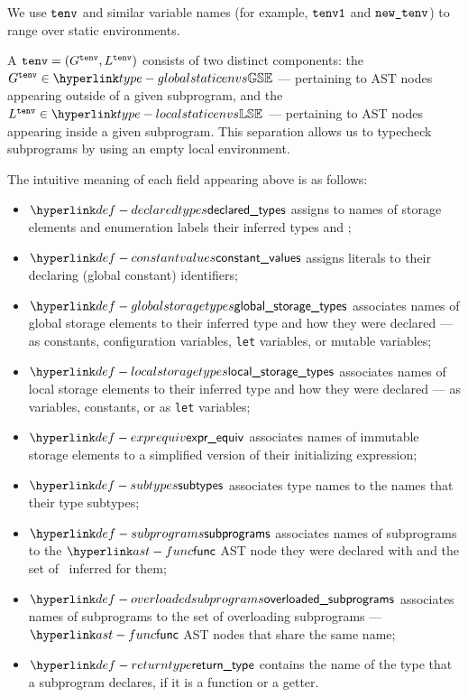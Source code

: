 We use $\texttt{tenv}$ and similar variable names (for example, $\texttt{tenv1}$ and $\texttt{new\_tenv}$) to range over static environments.

A \staticenvironmentterm{} $\texttt{tenv}=(G^{\texttt{tenv}}, L^{\texttt{tenv}})$ consists of two
distinct components: the \emph{\globalstaticenvironmentterm} $G^\tenv \in \globalstaticenvs$ --- pertaining to AST nodes
appearing outside of a given subprogram, and the \emph{\localstaticenvironmentterm}
$L^\tenv \in \localstaticenvs$ --- pertaining to AST nodes appearing inside a given subprogram.
This separation allows us to typecheck subprograms by using an empty local environment.

The intuitive meaning of each field appearing above is as follows:
\begin{itemize}
  \hypertarget{def-declaredtypes}{}
  \item $\declaredtypes$ assigns to names of storage elements and enumeration labels their inferred types and \purity{};
  \hypertarget{def-constantvalues}{}
  \item $\constantvalues$ assigns literals to their declaring (global constant) identifiers;
  \hypertarget{def-globalstoragetypes}{}
  \item $\globalstoragetypes$ associates names of global storage elements to their inferred type
  and how they were declared --- as constants, configuration variables, \texttt{let} variables,
  or mutable variables;
  \hypertarget{def-localstoragetypes}{}
  \item $\localstoragetypes$ associates names of local storage elements to their inferred type
  and how they were declared --- as variables, constants, or as \texttt{let} variables;
  \hypertarget{def-exprequiv}{}
  \item $\exprequiv$ associates names of immutable storage elements to a simplified version
  of their initializing expression;
  \hypertarget{def-subtypes}{}
  \item $\subtypes$ associates type names to the names that their type subtypes;
  \hypertarget{def-subprograms}{}
  \item $\subprograms$ associates names of subprograms to the $\func$ AST node they were
  declared with and the set of \sideeffectdescriptorsterm\ inferred for them;
  \hypertarget{def-overloadedsubprograms}{}
  \item $\overloadedsubprograms$ associates names of subprograms to the set of overloading
  subprograms ---  $\func$ AST nodes that share the same name;
  \hypertarget{def-returntype}{}
  \item $\returntype$ contains the name of the type that a subprogram declares, if it is
  a function or a getter.
\end{itemize}

